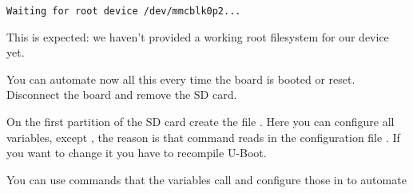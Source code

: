 \begin{verbatim}
Waiting for root device /dev/mmcblk0p2...
\end{verbatim}

This is expected: we haven't provided a working root filesystem for
our device yet.

You can automate now all this every time the board is booted or
reset. Disconnect the board and remove the SD card.

On the first partition of the SD card create the file .
Here you can configure all variables, except , the reason is that command reads in the configuration file . If you want to change it you have to recompile U-Boot.

You can use commands that the  variables call and configure those in  to automate 


